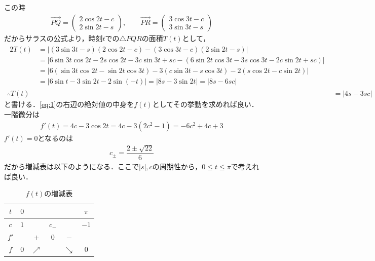\documentclass[../../main.tex]{subfiles}
\begin{document}
この時
\begin{align}
  \overrightarrow{PQ}=
  \begin{pmatrix}2\cos2t-c\\2\sin2t-s
  \end{pmatrix},\qquad
  \overrightarrow{PR}=
  \begin{pmatrix}3\cos3t-c\\3\sin3t-s
  \end{pmatrix}
\end{align}
だからサラスの公式より，時刻$t$での$\triangle PQR$の面積$T(t)$として，
\begin{align}
  \begin{split}
    2T(t)&=\left|(3\sin3t-s)(2\cos2t-c)-(3\cos3t-c)(2\sin2t-s)\right| \\
    &=\bigl|6\sin3t\cos2t-2s\cos2t-3c\sin3t+sc-(6\sin2t\cos3t-3s\cos3t-2c\sin2t+sc)\bigr| \\
    &=\bigl|6(\sin3t\cos2t-\sin2t\cos3t)-3(c\sin3t-s\cos3t)-2(s\cos2t-c\sin2t)\bigr| \\
    &=\bigl|6\sin t-3\sin2t-2\sin(-t)\bigr|
    =\bigl|8s-3\sin2t\bigr|
    =\bigl|8s-6sc\bigr|
  \end{split} \\
  \therefore
  T(t) &= \bigl|4s-3sc\bigr| \label{eq:1}
\end{align}
と書ける．\cref{eq:1}の右辺の絶対値の中身を$f(t)$としてその挙動を求めれば良い．
一階微分は
\begin{align}
  f'(t)=4c-3\cos2t=4c-3(2c^2-1)=-6c^2+4c+3
\end{align}
$f'(t)=0$となるのは
\begin{align}
  c_{\pm} = \dfrac{2\pm \sqrt{22}}{6}
\end{align}
だから増減表は以下のようになる．ここで$|s|,c$の周期性から，$0\le t\le\pi$で考えれば良い．

\begin{table}[htb]
  \begin{center}
    \caption{$f(t)$の増減表}
    \begin{tabular}{c|ccccc}
      $t$ & $0$ & & & & $\pi$ \\
      \hline
      $c$ & $1$ & & $c_{-}$ & & $-1$ \\
      \hline
      $f'$ & & $+$ & $0$ & $-$ & \\
      \hline
      $f$ & $0$ & $\nearrow$ & & $\searrow$ & $0$
    \end{tabular}
  \end{center}
\end{table}
\end{document}
